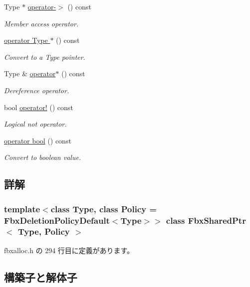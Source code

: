 \begin{DoxyCompactItemize}
Type $\ast$ \hyperlink{class_fbx_shared_ptr_ab52fbd8433b61e009074282c88814f7c}{operator-\/$>$} () const
\begin{DoxyCompactList}\small\item\em Member access operator. \end{DoxyCompactList}\item 
\hyperlink{class_fbx_shared_ptr_a4204201633921f32c564bd9329fe78fb}{operator Type $\ast$} () const
\begin{DoxyCompactList}\small\item\em Convert to a Type pointer. \end{DoxyCompactList}\item 
Type \& \hyperlink{class_fbx_shared_ptr_afc7cbb06097e354e016dbc58a2bd06a4}{operator$\ast$} () const
\begin{DoxyCompactList}\small\item\em Dereference operator. \end{DoxyCompactList}\item 
bool \hyperlink{class_fbx_shared_ptr_ac52a41b234d83cb8fa5deb75e740d950}{operator!} () const
\begin{DoxyCompactList}\small\item\em Logical not operator. \end{DoxyCompactList}\item 
\hyperlink{class_fbx_shared_ptr_a5e33203c68a6b6afe36eab50c491ff95}{operator bool} () const
\begin{DoxyCompactList}\small\item\em Convert to boolean value. \end{DoxyCompactList}\end{DoxyCompactItemize}


\subsection{詳解}
\subsubsection*{template$<$class Type, class Policy = Fbx\+Deletion\+Policy\+Default$<$\+Type$>$$>$\newline
class Fbx\+Shared\+Ptr$<$ Type, Policy $>$}



 fbxalloc.\+h の 294 行目に定義があります。



\subsection{構築子と解体子}
\mbox{\label{class_fbx_shared_ptr_a660b09efbcf67f747cb72163dccf1e11}} 
